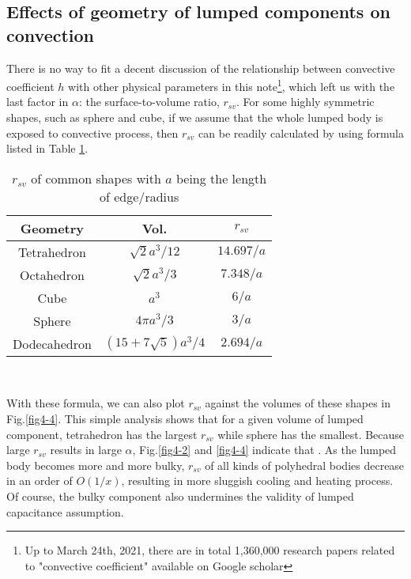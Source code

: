 \subsection{Effects of geometry of lumped components on convection}
There is no way to fit a decent discussion of the relationship between convective coefficient $h$ with other physical parameters in this note\footnote{Up to March 24th, 2021, there are in total 1,360,000 research papers related to "convective coefficient" available on Google scholar}, which left us with the last factor in $\alpha$: the surface-to-volume ratio, $r_{sv}$. For some highly symmetric shapes, such as sphere and cube, if we assume that the whole lumped body is exposed to convective process, then $r_{sv}$ can be readily calculated by using formula listed in Table \ref{tab4-3}.
\begin{table}[h]
\begin{center}
\small
\begin{tabular}{c|cc}
\hline
Geometry     & Vol.             & $r_{sv}$       \\ \hline
Tetrahedron  & $\sqrt{2}a^3/12$ & ${14.697}/{a}$ \\
Octahedron   & $\sqrt{2}a^3/3$  & ${7.348}/{a}$  \\
Cube         &      $a^3$       & ${6}/{a}$      \\
Sphere       &   $4\pi a^3/3$   & ${3}/{a}$      \\
Dodecahedron &$(15+7\sqrt{5})a^{3}/4$& ${2.694}/{a}$  \\ \hline
\end{tabular}
\end{center}
\caption{$r_{sv}$ of common shapes with $a$ being the length of edge/radius}\
\label{tab4-3}
\end{table}
With these formula, we can also plot $r_{sv}$ against the volumes of these shapes in Fig.\ref{fig4-4}. This simple analysis shows that for a given volume of lumped component, tetrahedron has the largest $r_{sv}$ while sphere has the smallest. Because large $r_{sv}$ results in large $\alpha$, Fig.\ref{fig4-2} and \ref{fig4-4} indicate that . As the lumped body becomes more and more bulky, $r_{sv}$ of all kinds of polyhedral bodies decrease in an order of $O(1/x)$, resulting in more sluggish cooling and heating process. Of course, the bulky component also undermines the validity of lumped capacitance assumption.

